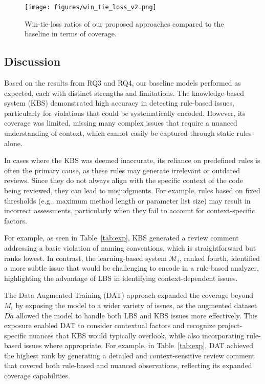 \begin{figure*}[htbp!]
  \centering
  \texttt{[image: figures/win\_tie\_loss\_v2.png]}
  \caption{Win-tie-loss ratios of our proposed approaches compared to the baseline in terms of coverage. }
  \label{fig:wtl}
\end{figure*}

\subsection{Discussion}
Based on the results from RQ3 and RQ4, our baseline models performed as expected, each with distinct strengths and limitations. The knowledge-based system (KBS) demonstrated high accuracy in detecting rule-based issues, particularly for violations that could be systematically encoded. 
However, its coverage was limited, missing many complex issues that require a nuanced understanding of context, which cannot easily be captured through static rules alone. 

In cases where the KBS was deemed inaccurate, its reliance on predefined rules is often the primary cause, as these rules may generate irrelevant or outdated reviews. Since they do not always align with the specific context of the code being reviewed, they can lead to misjudgments. For example, rules based on fixed thresholds (e.g., maximum method length or parameter list size) may result in incorrect assessments, particularly when they fail to account for context-specific factors.

For example, as seen in Table~\ref{tab:exp}, KBS generated a review comment addressing a basic violation of naming conventions, which is straightforward but ranks lowest. In contrast, the learning-based system \(\mathcal{M}_i\), ranked fourth, identified a more subtle issue that would be challenging to encode in a rule-based analyzer, highlighting the advantage of LBS in identifying context-dependent issues.


The Data Augmented Training (DAT) approach expanded the coverage beyond \(M_i\) by exposing the model to a wider variety of issues, as the augmented dataset \(Da\) allowed the model to handle both LBS and KBS issues more effectively. This exposure enabled DAT to consider contextual factors and recognize project-specific nuances that KBS would typically overlook, while also incorporating rule-based issues where appropriate. For example, in Table~\ref{tab:exp}, DAT achieved the highest rank by generating a detailed and context-sensitive review comment that covered both rule-based and nuanced observations, reflecting its expanded coverage capabilities.

